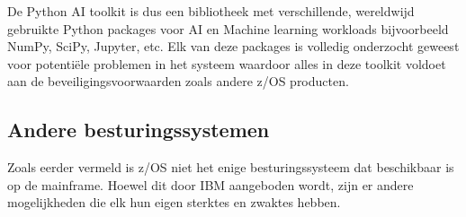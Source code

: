De Python AI toolkit is dus een bibliotheek met verschillende, wereldwijd gebruikte Python packages voor AI en Machine learning workloads bijvoorbeeld NumPy, SciPy, Jupyter, etc. Elk van deze packages is volledig onderzocht geweest voor potentiële problemen in het systeem waardoor alles in deze toolkit voldoet aan de beveiligingsvoorwaarden zoals andere z/OS producten. \autocite{Bostian2023}

\subsection{Andere besturingssystemen}
Zoals eerder vermeld is z/OS niet het enige besturingssysteem dat beschikbaar is op de mainframe. Hoewel dit door IBM aangeboden wordt, zijn er andere mogelijkheden die elk hun eigen sterktes en zwaktes hebben. \\

